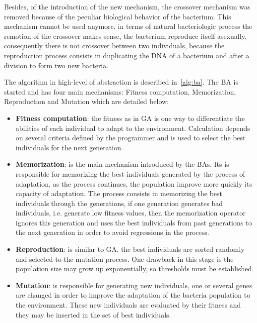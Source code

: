 Besides, of the introduction of the new mechanism, the crossover mechanism was
removed because of the peculiar biological behavior of the bacterium. This mechanism
cannot be used anymore, in terms of natural bacteriologic process the remotion of
the crossover makes sense, the bacterium reproduce itself asexually, consequently
there is not crossover between two individuals, because the reproduction process
consists in duplicating the DNA of a bacterium and after a division to form two
new bacteria.

The algorithm in high-level of abstraction is described in~\ref{alg:ba}.
The BA is started and has four main mechanisms: Fitness computation, Memorization,
Reproduction and Mutation which are detailed below:

\begin{itemize}
	\item {\bf Fitness computation}: the fitness as in GA is one way to 	
	differentiate the abilities of each individual to adapt to the
	environment. Calculation depends on several criteria defined by 
	the programmer and is used to select the best individuals for the next generation.

	\item {\bf Memorization}: is the main mechanism introduced by the BAs. Its is responsible
	for memorizing the best individuals generated by the process of adaptation,
	as the process continues, the population improve more quickly its capacity of
	adaptation. The process consists in memorizing the best individuals through 
	the	generations, if one generation generates bad individuals, i.e. generate low
	fitness values, then the memorization operator ignores this generation and
	uses the best individuals from past generations to the next generation in order
	to avoid regressions in the process.

	\item {\bf Reproduction}: is similar to GA, the best individuals are sorted randomly
	and selected to the mutation process. One drawback in this stage is the population
    size may grow up exponentially, so thresholds must be established.

	\item {\bf Mutation}: is responsible for generating new individuals, one
	or several genes are changed in order to improve the adaptation of the bacteria
	population to the environment. These new individuals are evaluated by their
	fitness and they may be inserted in the set of best	individuals.

\end{itemize}


